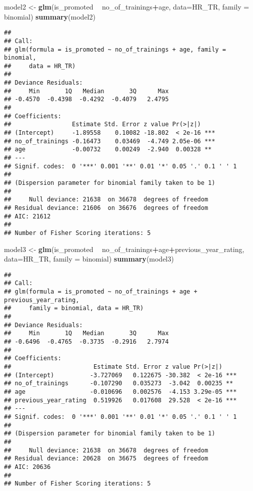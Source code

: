 \documentclass[
]{article}
\newenvironment{Shaded}{\begin{snugshade}}{\end{snugshade}}
\newcommand{\DataTypeTok}[1]{\textcolor[rgb]{0.13,0.29,0.53}{#1}}
\newcommand{\KeywordTok}[1]{\textcolor[rgb]{0.13,0.29,0.53}{\textbf{#1}}}
\newcommand{\NormalTok}[1]{#1}
\newcommand{\OperatorTok}[1]{\textcolor[rgb]{0.81,0.36,0.00}{\textbf{#1}}}
\newcommand{\StringTok}[1]{\textcolor[rgb]{0.31,0.60,0.02}{#1}}
\begin{document}
\begin{Shaded}
\begin{Highlighting}[]
\NormalTok{model2 <-}\StringTok{ }\KeywordTok{glm}\NormalTok{(is_promoted }\OperatorTok{~}\StringTok{ }\NormalTok{no_of_trainings}\OperatorTok{+}\NormalTok{age, }\DataTypeTok{data=}\NormalTok{HR_TR, }\DataTypeTok{family =}\NormalTok{ binomial)}
\KeywordTok{summary}\NormalTok{(model2)}
\end{Highlighting}
\end{Shaded}

\begin{verbatim}
## 
## Call:
## glm(formula = is_promoted ~ no_of_trainings + age, family = binomial, 
##     data = HR_TR)
## 
## Deviance Residuals: 
##     Min       1Q   Median       3Q      Max  
## -0.4570  -0.4398  -0.4292  -0.4079   2.4795  
## 
## Coefficients:
##                 Estimate Std. Error z value Pr(>|z|)    
## (Intercept)     -1.89558    0.10082 -18.802  < 2e-16 ***
## no_of_trainings -0.16473    0.03469  -4.749 2.05e-06 ***
## age             -0.00732    0.00249  -2.940  0.00328 ** 
## ---
## Signif. codes:  0 '***' 0.001 '**' 0.01 '*' 0.05 '.' 0.1 ' ' 1
## 
## (Dispersion parameter for binomial family taken to be 1)
## 
##     Null deviance: 21638  on 36678  degrees of freedom
## Residual deviance: 21606  on 36676  degrees of freedom
## AIC: 21612
## 
## Number of Fisher Scoring iterations: 5
\end{verbatim}

\begin{Shaded}
\begin{Highlighting}[]
\NormalTok{model3 <-}\StringTok{ }\KeywordTok{glm}\NormalTok{(is_promoted }\OperatorTok{~}\StringTok{ }\NormalTok{no_of_trainings}\OperatorTok{+}\NormalTok{age}\OperatorTok{+}\NormalTok{previous_year_rating, }\DataTypeTok{data=}\NormalTok{HR_TR, }
              \DataTypeTok{family =}\NormalTok{ binomial)}
\KeywordTok{summary}\NormalTok{(model3)}
\end{Highlighting}
\end{Shaded}

\begin{verbatim}
## 
## Call:
## glm(formula = is_promoted ~ no_of_trainings + age + previous_year_rating, 
##     family = binomial, data = HR_TR)
## 
## Deviance Residuals: 
##     Min       1Q   Median       3Q      Max  
## -0.6496  -0.4765  -0.3735  -0.2916   2.7974  
## 
## Coefficients:
##                       Estimate Std. Error z value Pr(>|z|)    
## (Intercept)          -3.727069   0.122675 -30.382  < 2e-16 ***
## no_of_trainings      -0.107290   0.035273  -3.042  0.00235 ** 
## age                  -0.010696   0.002576  -4.153 3.29e-05 ***
## previous_year_rating  0.519926   0.017608  29.528  < 2e-16 ***
## ---
## Signif. codes:  0 '***' 0.001 '**' 0.01 '*' 0.05 '.' 0.1 ' ' 1
## 
## (Dispersion parameter for binomial family taken to be 1)
## 
##     Null deviance: 21638  on 36678  degrees of freedom
## Residual deviance: 20628  on 36675  degrees of freedom
## AIC: 20636
## 
## Number of Fisher Scoring iterations: 5
\end{verbatim}
\end{document}
